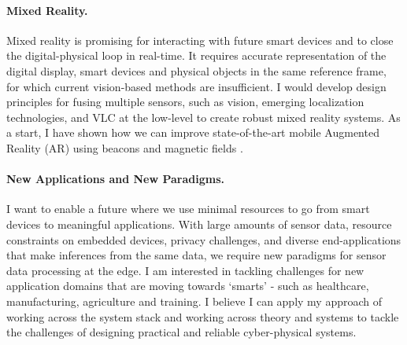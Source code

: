 \documentclass[10pt]{article}
\begin{document}
\paragraph{Mixed Reality. }
Mixed reality is promising for interacting with future smart devices and to close the digital-physical loop in real-time. It requires accurate representation of the digital display, smart devices and physical objects in the same reference frame, for which current vision-based methods are insufficient.
I would develop design principles for fusing multiple sensors, such as vision, emerging localization technologies, and VLC at the low-level to create robust mixed reality systems. As a start, I have shown how we can improve state-of-the-art mobile Augmented Reality (AR) using beacons and magnetic fields \cite{mobileAR}. %


\paragraph{New Applications and New Paradigms. }
I want to enable a future where we use minimal resources to go from smart devices to meaningful applications. 
With large amounts of sensor data, resource constraints on embedded devices, privacy challenges, and diverse end-applications that make	 inferences from the same data, we require new paradigms for 
sensor data processing at the edge. %
I am interested in tackling challenges for new application domains that are moving towards `smarts' - such as healthcare, manufacturing, agriculture and training. 
I believe I can apply my approach of working across the system stack and working across theory and systems %
to tackle the challenges of designing practical and reliable cyber-physical systems. 








\footnotesize


\end{document}
